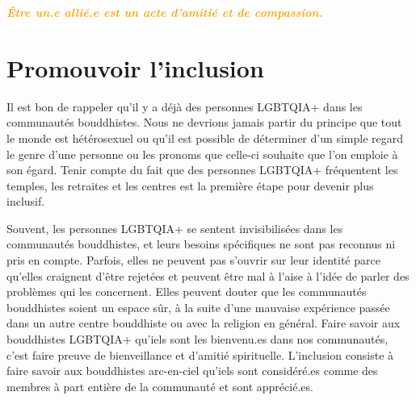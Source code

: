 \documentclass[12pt,openany]{book}
\renewenvironment{quote}{%
  \list{}{%
    \leftmargin-0.1cm   %
    \rightmargin\leftmargin
  }
  \item\relax
}
{\endlist}
\begin{document}
\begin{quote}
\centering
\doublespacing
\textit{\Large \textbf{\textcolor{orange}{Être un.e allié.e est un acte d’amitié et de compassion.}}}
\end{quote}

\section*{Promouvoir l’inclusion}

\noindent Il est bon de rappeler qu’il y a déjà des personnes \mbox{LGBTQIA+} dans les communautés bouddhistes. Nous ne devrions jamais partir du principe que tout le monde est hétérosexuel ou qu’il est possible de déterminer d’un simple regard le genre d’une personne ou les pronoms que celle-ci souhaite que l’on emploie à son égard. Tenir compte du fait que des personnes \mbox{LGBTQIA+} fréquentent les temples, les retraites et les centres est la première étape pour devenir plus inclusif.

Souvent, les personnes \mbox{LGBTQIA+} se sentent invisibilisées dans les communautés bouddhistes, et leurs besoins spécifiques ne sont pas reconnus ni pris en compte. Parfois, elles ne peuvent pas s’ouvrir sur leur identité parce qu’elles craignent d’être rejetées et peuvent être mal à l’aise à l’idée de parler des problèmes qui les concernent. Elles peuvent douter que les communautés bouddhistes soient un espace sûr, à la suite d’une mauvaise expérience passée dans un autre centre bouddhiste ou avec la religion en général. Faire savoir aux bouddhistes \mbox{LGBTQIA+} qu’iels sont les bienvenu.es dans nos communautés, c’est faire preuve de bienveillance et d’amitié spirituelle. L’inclusion consiste à faire savoir aux bouddhistes arc-en-ciel qu’iels sont considéré.es comme des membres à part entière de la communauté et sont apprécié.es.

\begin{figure}[h]
    \centering
\end{figure}
\end{document}
